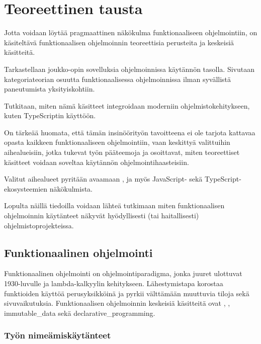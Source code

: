 \vspace{21.5pt}
\chapter{Teoreettinen tausta}

Jotta voidaan löytää pragmaattinen näkökulma funktionaaliseen ohjelmointiin, on käsiteltävä funktionaalisen ohjelmoinnin teoreettisia perusteita ja keskeisiä käsitteitä.

Tarkastellaan joukko-opin sovelluksia ohjelmoinnissa käytännön tasolla. Sivutaan kategoriateorian osuutta funktionaalisessa ohjelmoinnissa ilman syvällistä paneutumista yksityiskohtiin.

Tutkitaan, miten nämä käsitteet integroidaan moderniin ohjelmistokehitykseen, kuten TypeScriptin käyttöön.

On tärkeää huomata, että tämän insinöörityön tavoitteena ei ole tarjota kattavaa opasta kaikkeen funktionaaliseen ohjelmointiin, vaan keskittyä valittuihin aihealueisiin, jotka tukevat työn pääteemoja ja osoittavat, miten teoreettiset käsitteet voidaan soveltaa käytännön ohjelmointihaasteisiin.

Valitut aihealueet pyritään avaamaan , ja myös JavaScript- sekä TypeScript-ekosysteemien näkökulmista.

Lopulta näillä tiedoilla voidaan lähteä tutkimaan miten funktionaalisen ohjelmoinnin käytänteet näkyvät hyödyllisesti (tai haitallisesti) ohjelmistoprojekteissa.

\section{Funktionaalinen ohjelmointi}

Funktionaalinen ohjelmointi on ohjelmointiparadigma, jonka juuret ulottuvat 1930-luvulle ja lambda-kalkyylin kehitykseen. Lähestymistapa korostaa funktioiden käyttöä perusyksikköinä ja pyrkii välttämään muuttuvia tiloja sekä sivuvaikutuksia. Funktionaalisen ohjelmoinnin keskeisiä käsitteitä ovat , , \gls{immutable_data} sekä \gls{declarative_programming}. \citep{Tan2004,computerphile_lambda}

\subsection{Työn nimeämiskäytänteet}

